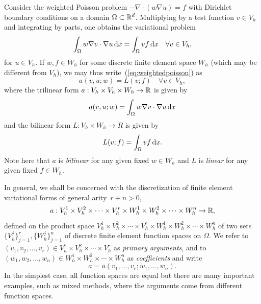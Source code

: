 Consider the weighted Poisson problem $- \nabla \cdot (w \nabla u) =
f$ with Dirichlet boundary conditions on a domain $\Omega \subset
\mathbb{R}^d$.  Multiplying by a test function $v \in V_h$ and integrating by
parts, one obtains the variational problem
\begin{equation} \label{eq:weightedpoisson}
  \int_{\Omega} w \nabla v \cdot \nabla u \, \mathrm{d}x = \int_{\Omega} v f \, \mathrm{d}x
  \quad \forall v \in V_h,
\end{equation}
for $u \in V_h$. If $w, f \in W_h$ for some discrete finite element space
$W_h$ (which may be different from $V_h$), we may thus
write~(\ref{eq:weightedpoisson}) as
\begin{equation}
  a(v, u; w) = L(v; f) \quad \forall v \in V_h,
\end{equation}
where the trilinear form $a : V_h \times V_h \times W_h \rightarrow \mathbb{R}$ is given by
\begin{equation}
  a(v, u; w) = \int_{\Omega} w \nabla v \cdot \nabla u \, \mathrm{d}x
\end{equation}
and the bilinear form $L : V_h \times W_h \rightarrow R$ is given by
\begin{equation}
  L(v; f) = \int_{\Omega} v f \, \mathrm{d}x.
\end{equation}
Note here that $a$ is \emph{bilinear} for any given fixed $w \in W_h$
and $L$ is \emph{linear} for any given fixed $f \in W_h$.

In general, we shall be concerned with the discretization of
finite element variational forms of general arity~$r + n > 0$,
\begin{equation} \label{eq:variationalform}
  a : V_h^1 \times V_h^2 \times \cdots \times V_h^r \times
  W_h^1 \times W_h^2 \times \cdots \times W_h^n \rightarrow \mathbb{R},
\end{equation}
defined on the product space $V_h^1 \times V_h^2 \times \cdots \times
V_h^r \times W_h^1 \times W_h^2 \times \cdots \times W_h^n$ of two
sets $\{V_h^j\}_{j=1}^r, \{W_h^j\}_{j=1}^n$ of discrete finite element
function spaces on $\Omega$. We refer to
$(v_1, v_2, \ldots, v_r) \in V_h^1 \times V_h^2 \times \cdots \times V_h^r$
as \emph{primary arguments},
and to
$(w_1, w_2, \ldots, w_n) \in W_h^1 \times W_h^2 \times \cdots \times W_h^n$
as \emph{coefficients} and write
\begin{equation}
a = a(v_1, \ldots, v_r; w_1, \ldots, w_n).
\label{eq:gen_form}
\end{equation}
In the simplest case, all function spaces are equal but there are many
important examples, such as mixed methods, where the
arguments come from different function spaces.

